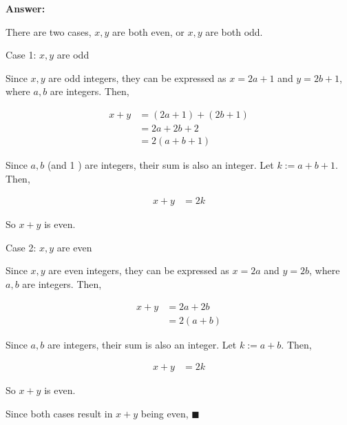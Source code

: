 \documentclass[14pt]{extreport}
\newcommand{\answer}[0]{\medskip \textbf{Answer:} \medskip}
\begin{document}
\answer

There are two cases, \( x, y \) are both even, or \( x, y \) are both odd.

\medskip

Case 1: \( x, y \) are odd

Since \( x, y \) are odd integers, they can be expressed as \( x = 2a + 1 \) and \( y = 2b + 1 \), where \( a, b \) are integers. Then,

\begin{align*}
    x + y &= (2a + 1) + (2b + 1) \\
          &= 2a + 2b + 2 \\
          &= 2(a + b + 1)
\end{align*}

Since \( a, b \) (and 1 ) are integers, their sum is also an integer. Let \( k := a + b + 1 \). Then,

\begin{align*}
    x + y &= 2k
\end{align*}

So \( x + y \) is even.

\medskip

Case 2: \( x, y \) are even

Since \( x, y \) are even integers, they can be expressed as \( x = 2a \) and \( y = 2b \), where \( a, b \) are integers. Then,

\begin{align*}
    x + y &= 2a + 2b \\
          &= 2(a + b)
\end{align*}

Since \( a, b \) are integers, their sum is also an integer. Let \( k := a + b \). Then,

\begin{align*}
    x + y &= 2k
\end{align*}

So \( x + y \) is even.

\bigskip

Since both cases result in \( x + y \) being even, \( \blacksquare \)
\end{document}
